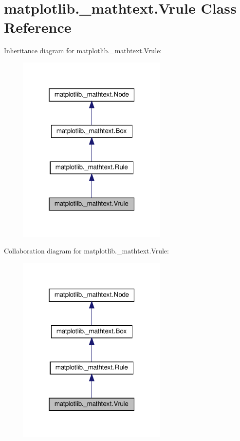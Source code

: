 \hypertarget{classmatplotlib_1_1__mathtext_1_1Vrule}{}\section{matplotlib.\+\_\+mathtext.\+Vrule Class Reference}
\label{classmatplotlib_1_1__mathtext_1_1Vrule}


Inheritance diagram for matplotlib.\+\_\+mathtext.\+Vrule\+:
\nopagebreak
\begin{figure}[H]
\begin{center}
\leavevmode
\includegraphics[width=211pt]{classmatplotlib_1_1__mathtext_1_1Vrule__inherit__graph}
\end{center}
\end{figure}


Collaboration diagram for matplotlib.\+\_\+mathtext.\+Vrule\+:
\nopagebreak
\begin{figure}[H]
\begin{center}
\leavevmode
\includegraphics[width=211pt]{classmatplotlib_1_1__mathtext_1_1Vrule__coll__graph}
\end{center}
\end{figure}
